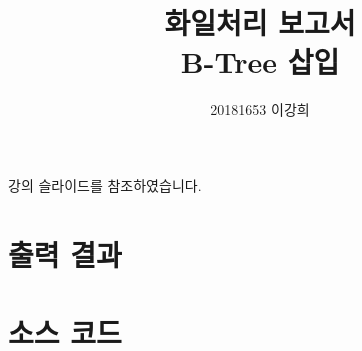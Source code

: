 \documentclass[10pt]{article}
\title{화일처리 보고서\\B-Tree 삽입}
\author{20181653 이강희}
\begin{document}
\maketitle

\begin{center}
강의 슬라이드를 참조하였습니다.
\end{center}

\newpage

\section{출력 결과}



\section{소스 코드}

\inputminted[frame=lines, linenos]{cpp}{main.cpp}
\end{document}
